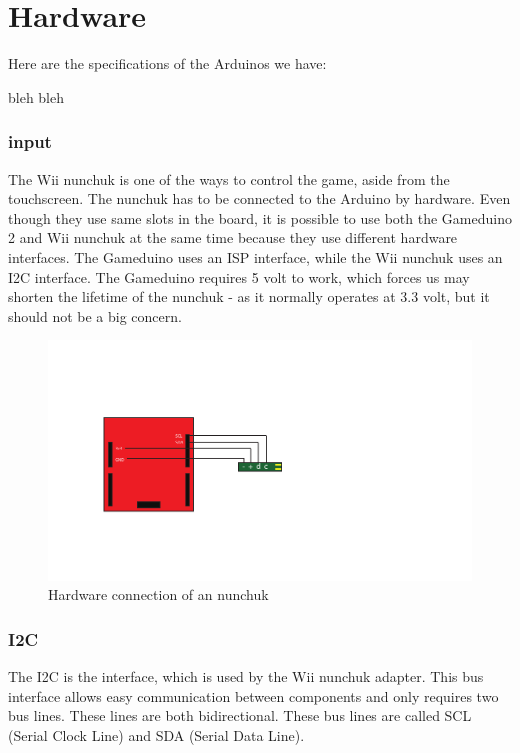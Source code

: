 \chapter{Hardware} %

Here are the specifications of the Arduinos we have:

bleh bleh


\subsection{input}
The Wii nunchuk is one of the ways to control the game, aside from the
touchscreen.
The nunchuk has to be connected to the Arduino by hardware. Even though they
use same slots in the board, it is possible to use both the Gameduino 2 and Wii
nunchuk at the same time because they use different hardware interfaces. The
Gameduino uses an ISP interface, while the Wii nunchuk uses an I2C interface.
The Gameduino requires 5 volt to work, which forces us may shorten the lifetime
of the nunchuk - as it normally operates at 3.3 volt, but it should not be a
big concern.


\begin{figure}[h]
\centering
\includegraphics{Figures/NunchuckConnection}
\caption{Hardware connection of an nunchuk}
\label{fig:nunchuk_connect}
\end{figure}


\subsection{I2C}
The I2C is the interface, which is used by the Wii nunchuk adapter. This bus
interface allows easy communication between components and only requires two
bus lines. These lines are both bidirectional. These bus lines are called SCL
(Serial Clock Line) and SDA (Serial Data Line).


